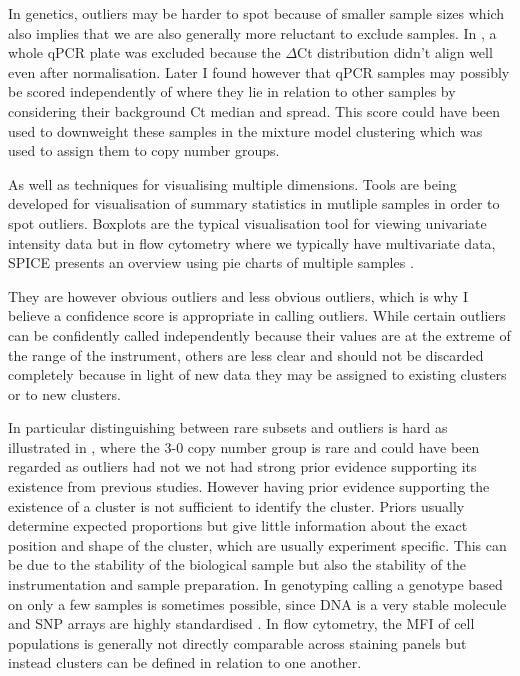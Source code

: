 In genetics, outliers may be harder to spot because of smaller sample sizes which also implies that we are also generally more reluctant to exclude samples.
In , a whole qPCR plate was excluded because the $\Delta$Ct distribution didn’t align well even after normalisation.
Later I found however that qPCR samples may possibly be scored independently of where they lie in relation to other samples by considering their background Ct median and spread.
This score could have been used to downweight these samples in the mixture model clustering which was used to assign them to copy number groups.

As well as techniques for visualising multiple dimensions.
Tools are being developed for visualisation of summary statistics in mutliple samples in order to spot outliers.
Boxplots are the typical visualisation tool for viewing univariate intensity data but in flow cytometry where we typically have multivariate data,
SPICE presents an overview using pie charts of multiple samples \citep{Roederer:2011hy}.

They are however obvious outliers and less obvious outliers, which is why I believe a confidence score is appropriate in calling outliers.
While certain outliers can be confidently called independently because their values are at the extreme of the range of the instrument,
others are less clear and should not be discarded completely because in light of new data they may be assigned to existing clusters or
to new clusters.

In particular distinguishing between rare subsets and outliers is hard as illustrated in ,
where the 3-0 copy number group is rare and could have been regarded as outliers had not we not had strong prior evidence supporting its existence
from previous studies.
However having prior evidence supporting the existence of a cluster is not sufficient to identify the cluster.
Priors usually determine expected proportions but give little information about the exact position and shape of the cluster, which are usually experiment
specific.
This can be due to the stability of the biological sample but also the stability of the instrumentation and sample preparation.
In genotyping calling a genotype based on only a few samples is sometimes possible, since DNA is a very stable molecule and SNP arrays are highly standardised
\citep{Di:2005uj,Giannoulatou:2008ty}.
In flow cytometry, the MFI of cell populations is generally not directly comparable across staining panels but instead clusters can be defined in relation to one another.


